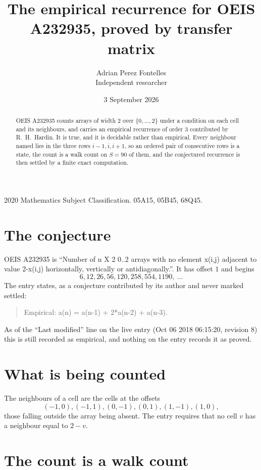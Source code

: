 \documentclass[11pt,a4paper]{article}
\title{The empirical recurrence for OEIS A232935, proved by transfer matrix}
\author{Adrian Perez Fontelles\\ \small Independent researcher}
\date{3 September 2026}
\theoremstyle{plain}
\theoremstyle{definition}
\begin{document}
\maketitle

\begin{abstract}
OEIS A232935 counts arrays of width $2$ over $\{0,\dots,2\}$ under a condition on each cell
and its neighbours, and carries an empirical recurrence of order $3$ contributed by
R.~H.~Hardin. It is true, and it is decidable rather than empirical. Every neighbour named lies
in the three rows $i-1,i,i+1$, so an ordered pair of consecutive rows is a state, the count is
a walk count on $S=90$ of them, and the conjectured recurrence is then settled by a finite
exact computation.
\end{abstract}

\noindent\small 2020 Mathematics Subject Classification. 05A15, 05B45, 68Q45.\normalsize

\section{The conjecture}

OEIS A232935 is ``Number of n X 2 0..2 arrays with no element x(i,j) adjacent to value 2-x(i,j) horizontally, vertically or antidiagonally.''. It has offset $1$ and begins
\[
6, 12, 26, 56, 120, 258, 554, 1190,\ \dots
\]
The entry states, as a conjecture contributed by its author and never marked settled:
\begin{quote}
Empirical: a(n) = a(n-1) + 2*a(n-2) + a(n-3).
\end{quote}
As of the ``Last modified'' line on the live entry (Oct 06 2018 06:15:20, revision 8) this is still
recorded as empirical, and nothing on the entry records it as proved.

\section{What is being counted}

The neighbours of a cell are the cells at the offsets
\[
(-1,0), (-1,1), (0,-1), (0,1), (1,-1), (1,0),
\]
those falling outside the array being absent. The entry requires that no cell $v$ has a neighbour equal to $2-v$.

\section{The count is a walk count}
\end{document}
